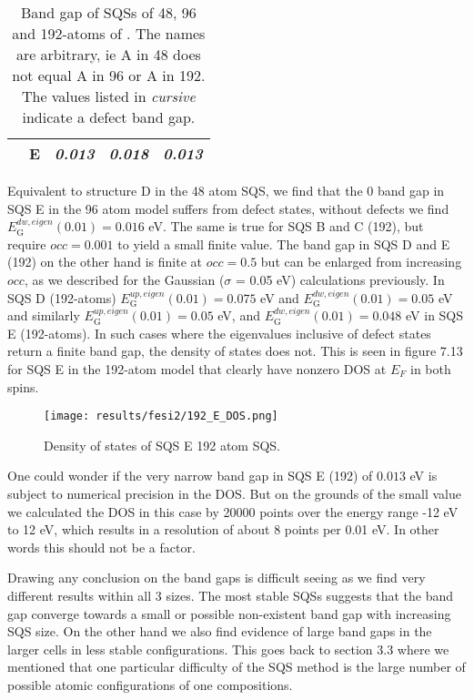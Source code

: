 \begin{table}[H]
\begin{tabular}{@{}ccccc@{}}
\multicolumn{1}{c|}{}                     & \textbf{E} & \textit{0.013}                                                                & \textit{0.018}                                                                         & \textit{0.013}                                                                          \\ \bottomrule 
\end{tabular}
\caption{Band gap of SQSs of 48, 96 and 192-atoms of . The names are arbitrary, ie A in 48 does not equal A in 96 or A in 192. The values listed in \textit{cursive} indicate a defect band gap.}
\end{table}

Equivalent to structure D in the 48 atom SQS, we find that the 0 band gap in SQS E in the 96 atom model suffers from defect states, without defects we find $E_\text{G} ^{dw, eigen}(0.01) = 0.016$ eV. The same is true for SQS B and C (192), but require $occ = 0.001$ to yield a small finite value. The band gap in SQS D and E (192) on the other hand is finite at $occ = 0.5$ but can be enlarged from increasing $occ$, as we described for the Gaussian ($\sigma$ = 0.05 eV) calculations previously. In SQS D (192-atoms) $E_\text{G} ^{up, eigen}(0.01) = 0.075$ eV and $E_\text{G} ^{dw, eigen}(0.01) = 0.05$ eV and similarly $E_\text{G} ^{up, eigen}(0.01) = 0.05$ eV, and $E_\text{G} ^{dw, eigen}(0.01) = 0.048$ eV in SQS E (192-atoms). In such cases where the eigenvalues inclusive of defect states return a finite band gap, the density of states does not. This is seen in figure 7.13 for SQS E in the 192-atom model that clearly have nonzero DOS at $E_F$ in both spins. 

\begin{figure}[H]
\centering
\texttt{[image: results/fesi2/192\_E\_DOS.png]}
\caption{Density of states of SQS E 192 atom SQS.}
\end{figure}    
 
One could wonder if the very narrow band gap in SQS E (192) of $0.013$ eV is subject to numerical precision in the DOS. But on the grounds of the small value we calculated the DOS in this case by 20000 points over the energy range -12 eV to 12 eV, which results in a resolution of about 8 points per 0.01 eV. In other words this should not be a factor. 
 
Drawing any conclusion on the band gaps is difficult seeing as we find very different results within all 3 sizes. The most stable SQSs suggests that the band gap converge towards a small or possible non-existent band gap with increasing SQS size. On the other hand we also find evidence of large band gaps in the larger cells in less stable configurations. This goes back to section 3.3 where we mentioned that one particular difficulty of the SQS method is the large number of possible atomic configurations of one compositions.    

